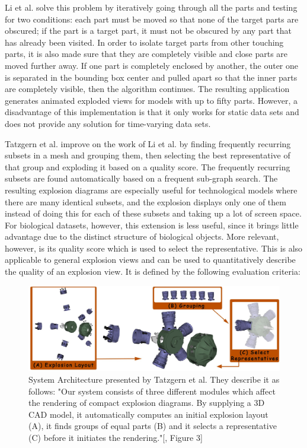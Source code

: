 Li et al. solve this problem by iteratively going through all the parts and testing for two conditions: each part must be moved so that none of the target parts are obscured; if the part is a target part, it must not be obscured by any part that has already been visited. 
In order to isolate target parts from other touching parts, it is also made sure that they are completely visible and close parts are moved further away. 
If one part is completely enclosed by another, the outer one is separated in the bounding box center and pulled apart so that the inner parts are completely visible, then the algorithm continues.
The resulting application generates animated exploded views for models with up to fifty parts. 
However, a disadvantage of this implementation is that it only works for static data sets and does not provide any solution for time-varying data sets.

Tatzgern et al. improve on the work of Li et al. by finding frequently recurring subsets in a mesh and grouping them, then selecting the best representative of that group and exploding it based on a quality score.\cite{Tatzgern_2010}
The frequently recurring subsets are found automatically based on a frequent sub-graph search.
The resulting explosion diagrams are especially useful for technological models where there are many identical subsets, and the explosion displays only one of them instead of doing this for each of these subsets and taking up a lot of screen space.  
For biological datasets, however, this extension is less useful, since it brings little advantage due to the distinct structure of biological objects.
More relevant, however, is its quality score which is used to select the representative. This is also applicable to general explosion views and can be used to quantitatively describe the quality of an explosion view. It is defined by the following evaluation criteria: 

\begin{figure}[t]
\centering
\includegraphics[width=.95\linewidth]{fig/Images/Tatzgern_fig3}
	\caption[]{System Architecture presented by Tatzgern et al. They describe it as follows: "Our system consists of three different modules which affect the rendering of compact explosion diagrams. By supplying a 3D CAD model, it automatically computes an initial explosion layout (A), it finds groups of equal parts (B) and it selects a representative (C) before it initiates the rendering."[\cite{Tatzgern_2010}, Figure 3]}
\end{figure}

